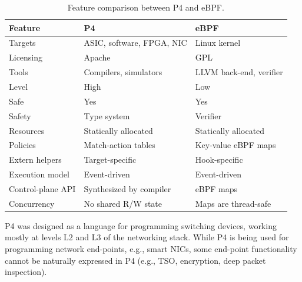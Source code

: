 \begin{table}[t]
  \footnotesize
  \begin{center}
  \begin{tabular}{|p{1.5cm}|p{2.7cm}|p{2.7cm}|} \hline
    \textbf{Feature} & \textbf{P4} & \textbf{eBPF} \\ \hline \hline
    Targets & ASIC, software, FPGA, NIC & Linux kernel \\ \hline
    Licensing & Apache & GPL \\ \hline
    Tools & Compilers, simulators & LLVM back-end, verifier \\ \hline
    Level & High & Low \\ \hline
    Safe  & Yes & Yes \\ \hline
    Safety & Type system & Verifier \\ \hline
    Resources & Statically allocated & Statically allocated \\ \hline
    Policies & Match-action tables & Key-value eBPF maps \\ \hline
    Extern helpers & Target-specific & Hook-specific \\ \hline
    Execution model & Event-driven & Event-driven \\ \hline
    Control-plane API & Synthesized by compiler & eBPF maps \\ \hline
    Concurrency & No shared R/W state & Maps are thread-safe \\ \hline
  \end{tabular}
  \caption{Feature comparison between P4 and eBPF.}\label{table:compare}
  \end{center}
\end{table}

P4 was designed as a language for programming switching devices,
working mostly at levels L2 and L3 of the networking stack.  While P4
is being used for programming network end-points, e.g., smart NICs,
some end-point functionality cannot be naturally expressed in P4
(e.g., TSO, encryption, deep packet inspection).

